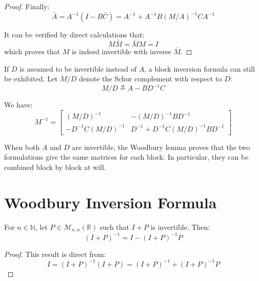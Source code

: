 \begin{proof}
	Finally:
	\begin{equation}
		\bar{A}=A^{-1}(I-B\bar{C})=A^{-1}+A^{-1}B(M/A)^{-1}CA^{-1}
	\end{equation}

	It can be verified by direct calculations that:
	\begin{equation}
		M\bar{M}=\bar{M}M=I
	\end{equation}
	which proves that $M$ is indeed invertible with inverse $\bar{M}$.
\end{proof}

\begin{remark}
	If $D$ is assumed to be invertible instead of $A$, a block inversion formula can still be exhibited. Let $M/D$ denote the Schur complement with respect to $D$:
	\begin{equation}
		M/D\triangleq A-BD^{-1}C
	\end{equation}

	We have:
	\begin{equation}
		M^{-1}=\begin{bmatrix}(M/D)^{-1}&-(M/D)^{-1}BD^{-1}\\-D^{-1}C(M/D)^{-1}&D^{-1}+D^{-1}C(M/D)^{-1}BD^{-1}\end{bmatrix}
	\end{equation}
\end{remark}

\begin{remark}
	When both $A$ and $D$ are invertible, the Woodbury lemma proves that the two formulations give the same matrices for each block. In particular, they can be combined block by block at will.
\end{remark}

\section{Woodbury Inversion Formula}

\begin{proposition}\label{th:simplified_Woodbury}
	For $n\in\mathbb{N}$, let $P\in\mathcal{M}_{n,n}(\mathbb{R})$ such that $I+P$ is invertible. Then:
	\begin{equation}
		(I+P)^{-1}=I-(I+P)^{-1}P
	\end{equation}
\end{proposition}

\begin{proof}
	This result is direct from:
	\begin{equation}
		I=(I+P)^{-1}(I+P)=(I+P)^{-1}+(I+P)^{-1}P
	\end{equation}
\end{proof}

